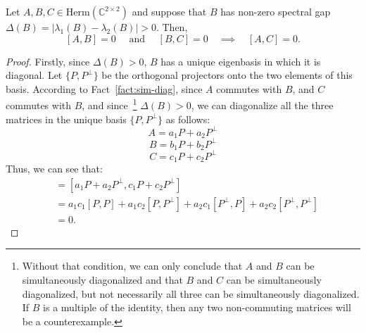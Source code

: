 \begin{lemma}\label{lem:transitivity}
Let $A,B,C \in \mathrm{Herm}(\mathbb{C}^{2 \times 2})$ and suppose that $B$ has non-zero spectral gap $\Delta(B)=|\lambda_1(B) - \lambda_2(B)| > 0$. Then, 
$$
[A,B] = 0 \quad \text{ and } \quad [B,C] = 0 \quad \implies \quad [A,C]=0.
$$
\end{lemma}
\begin{proof}
Firstly, since $\Delta(B) > 0$, $B$ has a unique eigenbasis in which it is diagonal. Let $\{P, P^\perp\}$ be the orthogonal projectors onto the two elements of this basis. 
According to Fact~\ref{fact:sim-diag}, since $A$ commutes with $B$, and $C$ commutes with $B$, and since~\footnote{Without that condition, we can only conclude that $A$ and $B$ can be simultaneously diagonalized and that $B$ and $C$ can be simultaneously diagonalized, but not necessarily all three can be simultaneously diagonalized. If $B$ is a multiple of the identity, then any two non-commuting matrices will be a counterexample.} $\Delta(B) > 0$, we can diagonalize all the three matrices in the unique basis $\{P, P^\perp\}$ as follows:
\begin{equation}
    A = a_1 P + a_2 P^\bot
\end{equation}
\begin{equation}
    B = b_1 P + b_2 P^\bot
\end{equation}
\begin{equation}
    C = c_1 P + c_2 P^\bot
\end{equation}
Thus, we can see that:
\begin{align*}
    [A, C] &= \left[a_1 P + a_2 P^\bot,  c_1 P + c_2 P^\bot\right]\\
    &= a_1c_1 [P, P] + a_1 c_2 [P, P^\bot] + a_2 c_1 [P^\bot, P] + a_2 c_2 [P^\bot, P^\bot]\\
    &= 0.
\end{align*}
\end{proof}